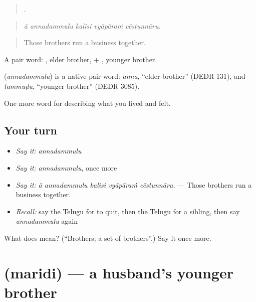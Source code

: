 \begin{quote}
    .
\end{quote}

\begin{quote}
\emph{ā annadammulu kalisi vyāpāraṁ cēstunnāru.}
\end{quote}

\begin{quote}
Those brothers run a business together.
\end{quote}

A pair word: , elder brother, + , younger brother.

\begin{cousinweb}
\textbf{} (\emph{annadammulu}) is a native pair word: \emph{anna}, \textquotedblleft{}elder brother\textquotedblright{} (DEDR 131), and \emph{tammuḍu}, \textquotedblleft{}younger brother\textquotedblright{} (DEDR 3085).
\end{cousinweb}

\begin{grammarlens}[title={What you've built}]
One more word for describing what you lived and felt.
\end{grammarlens}

\subsection*{Your turn}
\begin{itemize}
\raggedright
  \item \emph{Say it:} \emph{annadammulu}
  \item \emph{Say it:} \emph{annadammulu}, once more
  \item \emph{Say it:} \emph{ā annadammulu kalisi vyāpāraṁ cēstunnāru.} — Those brothers run a business together.
  \item \emph{Recall:} say the Telugu for to quit, then the Telugu for a sibling, then say \emph{annadammulu} again
\end{itemize}

\begin{tcolorbox}[breakable,colback=teal!4,colframe=teal!35!black,title={Before you move on}]
What does  mean? (\textquotedblleft{}Brothers; a set of brothers\textquotedblright{}.) Say it once more.
\end{tcolorbox}
\section[\texorpdfstring{\te{మరిది} (maridi)}{మరిది (maridi)}]{ (maridi) — a husband's younger brother}

